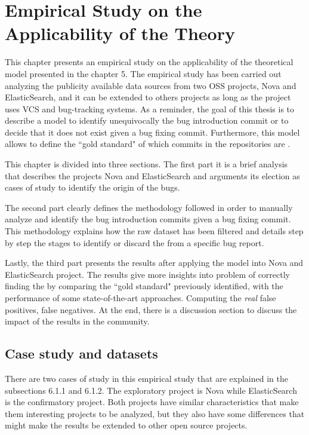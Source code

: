 \documentclass[a4paper, 12pt]{book}
\begin{document}
\cleardoublepage
\chapter{Empirical Study on the Applicability of the Theory}
\label{chap:application}
This chapter presents an empirical study on the applicability of the theoretical model presented in the chapter 5. The empirical study has been carried out analyzing the publicity available data sources from two OSS projects, Nova and ElasticSearch, and it can be extended to others projects as long as the project uses VCS and bug-tracking systems. As a reminder, the goal of this thesis is to describe a model to identify unequivocally the bug introduction commit or to decide that it does not exist given a bug fixing commit. Furthermore, this model allows to define the ``gold standard" of which commits in the repositories are \BIC. 

This chapter is divided into three sections. The first part it is a brief analysis that describes the projects Nova and ElasticSearch and arguments its election as cases of study to identify the origin of the bugs.

The second part clearly defines the methodology followed in order to manually analyze and identify the bug introduction commits given a bug fixing commit. This methodology explains how the raw dataset has been filtered and details step by step the stages to identify or discard the \BIC from a specific bug report.  

Lastly, the third part presents the results after applying the model into Nova and ElasticSearch project. The results give more insights into problem of correctly finding the \BIC by comparing the ``gold standard" previously identified, with the performance of some state-of-the-art approaches. Computing  the \emph{real} false positives, false negatives. At the end, there is a discussion section to discuss the impact of the results in the community.  

\section{Case study and datasets}
\label{sec:case}
There are two cases of study in this empirical study that are explained in the subsections 6.1.1 and 6.1.2. The exploratory project is Nova while ElasticSearch is the confirmatory project. Both projects have similar characteristics that make them interesting projects to be analyzed, but they also have some differences that might make the results be extended to other open source projects.  
\end{document}
